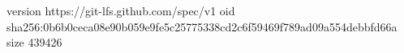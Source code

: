 version https://git-lfs.github.com/spec/v1
oid sha256:0b6b0ceca08e90b059e9fe5c25775338cd2c6f59469f789ad09a554debbfd66a
size 439426
